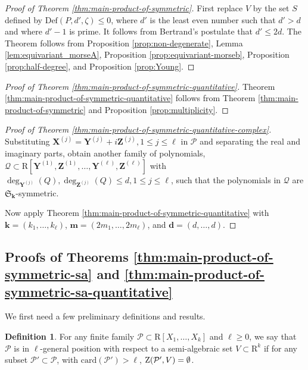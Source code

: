 \documentclass{amsart}
\theoremstyle{definition}
\newtheorem{definition}{Definition}
\theoremstyle{remark}
\numberwithin{equation}{section}
\begin{document}
\begin{proof}[Proof of Theorem \ref{thm:main-product-of-symmetric}]
First replace $V$ by the set $S$ defined by ${\mathrm{Def}}(P,d',\zeta) \leq 0$,
where $d'$ is the least even number such that $d' > d$ and
where $d'-1$ is prime. It follows from Bertrand's postulate that $d' \leq 2d$.
The Theorem follows from Proposition \ref{prop:non-degenerate}, 
Lemma   \ref{lem:equivariant_morseA},
Proposition \ref{prop:equivariant-morseb}, 
Proposition \ref{prop:half-degree}, and 
Proposition \ref{prop:Young}.
\end{proof}

\begin{proof}[Proof of Theorem \ref{thm:main-product-of-symmetric-quantitative}]
Theorem \ref{thm:main-product-of-symmetric-quantitative} follows from
Theorem \ref{thm:main-product-of-symmetric} and Proposition \ref{prop:multiplicity}.
\end{proof}

\begin{proof}[Proof of Theorem \ref{thm:main-product-of-symmetric-quantitative-complex}]
Substituting  ${\mathbf{X}}^{(j)} = {\mathbf{Y}}^{(j)}+ i {\mathbf{Z}}^{(j)}, 1 \leq j \leq \ell$ in $\mathcal{P}$
and separating the real and imaginary parts, obtain another family of polynomials,
$\mathcal{Q} \subset {\mathrm{R}}[{\mathbf{Y}}^{(1)},{\mathbf{Z}}^{(1)},\ldots, {\mathbf{Y}}^{(\ell)},{\mathbf{Z}}^{(\ell)}]$ with
$\deg_{{\mathbf{Y}}^{(j)}}(Q),\deg_{{\mathbf{Z}}^{(j)}}(Q) \leq d, 1 \leq j \leq \ell$, such that the polynomials in
$\mathcal{Q}$ are $\mathfrak{S}_{\mathbf{k}}$-symmetric.

Now apply Theorem \ref{thm:main-product-of-symmetric-quantitative} with
${\mathbf{k}}=(k_1,\ldots,k_\ell)$,
${\mathbf{m}} =(2m_1,\ldots,2m_\ell)$, and  
${\mathbf{d}}=(d,\ldots,d)$.
\end{proof}

\subsection{Proofs of Theorems \ref{thm:main-product-of-symmetric-sa} and \ref{thm:main-product-of-symmetric-sa-quantitative}}

We first need a few preliminary definitions and results.

\begin{definition}
  For any finite family $\mathcal{P} \subset {\mathrm{R}} [ X_{1} , \ldots ,X_{k} ]$ and
  $\ell \geq 0$, we say that $\mathcal{P}$ is in $\ell$-general position with
  respect to a semi-algebraic set $V \subset {\mathrm{R}}^{k}$ if for any subset
  $\mathcal{P}' \subset \mathcal{P}$, with ${\mathrm{card}} (\mathcal{P}') > \ell$, ${{\rm Z}} (\mathcal{P}' ,V) = \emptyset$. 
\end{definition}
\end{document}
